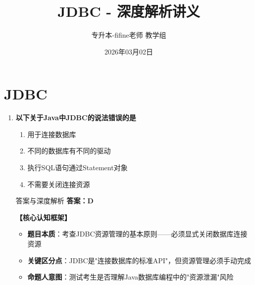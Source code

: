 \documentclass[12pt, a4paper]{ctexart}
\title{\textcolor{myblue}{\textbf{JDBC - 深度解析讲义}}}
\author{专升本-fifine老师 教学组}
\date{2026年03月02日}
\begin{document}
\maketitle
\thispagestyle{empty}
\newpage

\section{JDBC}

\begin{enumerate}[label=\textbf{\arabic*.}]

	\item \textbf{以下关于Java中JDBC的说法错误的是}
	      \begin{enumerate}[label=\Alph*.]
		      \item 用于连接数据库
		      \item 不同的数据库有不同的驱动
		      \item 执行SQL语句通过Statement对象
		      \item 不需要关闭连接资源
	      \end{enumerate}

	      \begin{bluebox}{答案与深度解析}
		      \textbf{答案：D}

		      \textbf{【核心认知框架】}
		      \begin{itemize}[label={}, leftmargin=*, nosep]
			      \item \textbf{题目本质}：考查JDBC资源管理的基本原则——必须显式关闭数据库连接资源
			      \item \textbf{关键区分点}：JDBC是"连接数据库的标准API"，但资源管理必须手动完成
			      \item \textbf{命题人意图}：测试考生是否理解Java数据库编程中的"资源泄漏"风险
		      \end{itemize}


\end{bluebox}
\end{enumerate}
\end{document}
